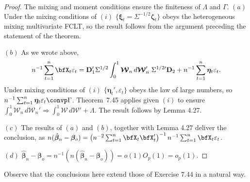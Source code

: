 \begin{proof}
The mixing and moment conditions ensure the finiteness of $\Lambda$ and $\Gamma$. $(a)$ Under the mixing conditions of $(i)$ $\{\boldsymbol{\xi}_t = \Sigma^{-1/2}\boldsymbol{\zeta}_t\}$ obeys the heterogeneous mixing multivariate FCLT, so the result follows from the argument preceding the statement of the theorem.

$(b)$ As we wrote above,
\[
n^{-1}\sum_{t=1}^{n} \bfX_t \varepsilon_t = \mathbf{D}_1'\Sigma^{1/2}\int_0^1 \boldsymbol{\mathcal{W}}_n\,d\boldsymbol{\mathcal{W}}_n'\;\Sigma^{1/2\prime}\mathbf{D}_2 + n^{-1}\sum_{t=1}^{n} \boldsymbol{\eta}_t \varepsilon_t.
\]
Under mixing conditions of $(i)$ $\{\boldsymbol{\eta}_t', \varepsilon_t\}$ obeys the law of large numbers, so $n^{-1}\sum_{t=1}^{n} \boldsymbol{\eta}_t \varepsilon_t \convp \Gamma$. Theorem~7.45 applies given $(i)$ to ensure $\int_0^1 \boldsymbol{\mathcal{W}}_n\,d\boldsymbol{\mathcal{W}}_n' \Rightarrow \int_0^1 \boldsymbol{\mathcal{W}}\,d\boldsymbol{\mathcal{W}}' + \Lambda$. The result follows by Lemma 4.27.

$(c)$ The results of $(a)$ and $(b)$, together with Lemma 4.27 deliver the conclusion, as $n(\hat{\boldsymbol{\beta}}_n - \boldsymbol{\beta}_o) = \left(n^{-2}\sum_{t=1}^{n} \bfX_t \bfX_t'\right)^{-1} n^{-1}\sum_{t=1}^{n} \bfX_t \varepsilon_t$.

$(d)$ $\hat{\boldsymbol{\beta}}_n - \boldsymbol{\beta}_o = n^{-1}\left(n(\hat{\boldsymbol{\beta}}_n - \boldsymbol{\beta}_o)\right) = o(1)O_p(1) = o_p(1)$.
\end{proof}

Observe that the conclusions here extend those of Exercise 7.44 in a natural way.

